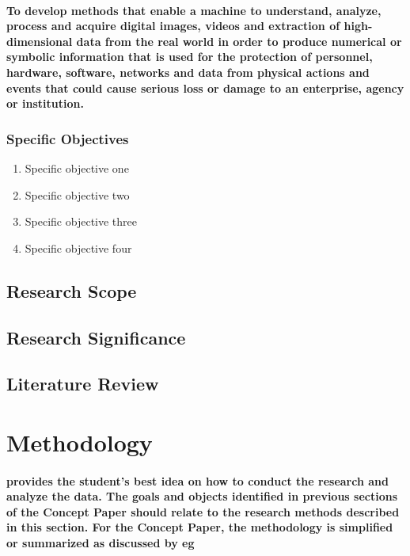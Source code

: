 \documentclass[11pt]{article}
\begin{document}
	   \paragraph{\textmd{To develop methods that enable a machine to understand, analyze, process and acquire digital images, videos and extraction of high-dimensional data from the real world in order to produce numerical or symbolic information that is used for the protection of personnel, hardware, software, networks and data from physical actions and events that could cause serious loss or damage to an enterprise, agency or institution.}}
	   
	   \subsubsection{\textbf{Specific Objectives}}
	   
	   \begin{enumerate}
	   
	   \item Specific objective one
	   \item Specific objective two
	   \item Specific objective three
	   \item Specific objective four
	           
	   \end{enumerate} 
	   \subsection{\textbf{Research Scope}}

	   \subsection{\textbf{Research Significance}}
	   \subsection{\textbf{Literature Review}}
	   
	   \section{\textbf{Methodology}}
	   \paragraph{\textmd{provides the student’s best idea on how to conduct the research and analyze the data. The goals and objects identified in previous sections of the Concept Paper should relate to the research methods described in this section.  For the Concept Paper, the methodology is simplified or summarized as discussed by eg \cite{DUMMY:1}}}
	   
\end{document}
